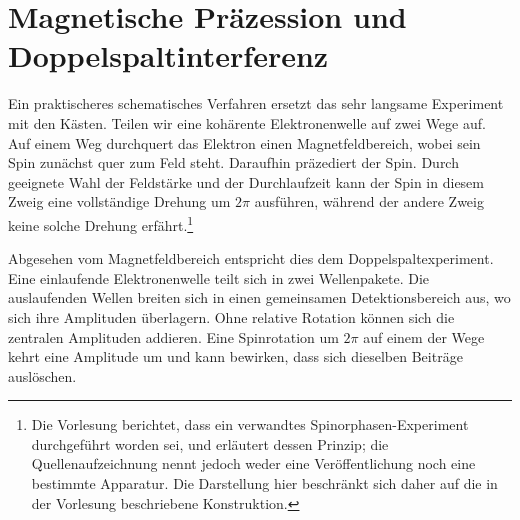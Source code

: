 \section{Magnetische Präzession und Doppelspaltinterferenz}

Ein praktischeres schematisches Verfahren ersetzt das sehr langsame Experiment mit den Kästen. Teilen wir eine kohärente Elektronenwelle auf zwei Wege auf. Auf einem Weg durchquert das Elektron einen Magnetfeldbereich, wobei sein Spin zunächst quer zum Feld steht. Daraufhin präzediert der Spin. Durch geeignete Wahl der Feldstärke und der Durchlaufzeit kann der Spin in diesem Zweig eine vollständige Drehung um \(2\pi\) ausführen, während der andere Zweig keine solche Drehung erfährt.\footnote{Die Vorlesung berichtet, dass ein verwandtes Spinorphasen-Experiment durchgeführt worden sei, und erläutert dessen Prinzip; die Quellenaufzeichnung nennt jedoch weder eine Veröffentlichung noch eine bestimmte Apparatur. Die Darstellung hier beschränkt sich daher auf die in der Vorlesung beschriebene Konstruktion.}

\begin{classroomqa}
\end{classroomqa}

\begin{classroomqa}
\end{classroomqa}

Abgesehen vom Magnetfeldbereich entspricht dies dem Doppelspaltexperiment. Eine einlaufende Elektronenwelle teilt sich in zwei Wellenpakete. Die auslaufenden Wellen breiten sich in einen gemeinsamen Detektionsbereich aus, wo sich ihre Amplituden überlagern. Ohne relative Rotation können sich die zentralen Amplituden addieren. Eine Spinrotation um \(2\pi\) auf einem der Wege kehrt eine Amplitude um und kann bewirken, dass sich dieselben Beiträge auslöschen.

